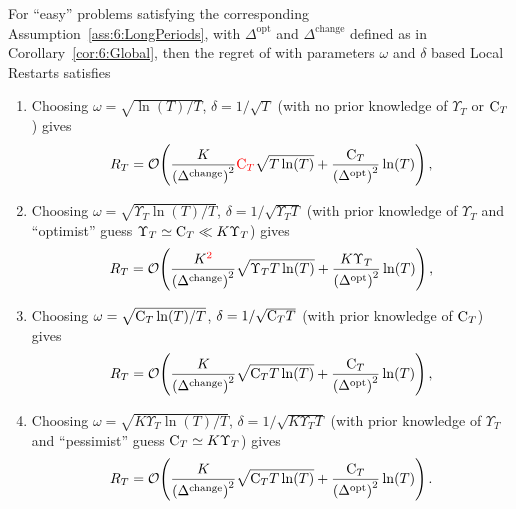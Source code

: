 \begin{corollary}\label{cor:6:Local}
    For ``easy'' problems satisfying the corresponding Assumption~\ref{ass:6:LongPeriods},
    with $\Delta^{\text{opt}}$ and ${\Delta}^{\text{change}}$ defined as in Corollary~\ref{cor:6:Global}, then the regret of \GLRklUCB{} with parameters $\omega$ and $\delta$ based Local Restarts satisfies

    \begin{enumerate}
        \item
        Choosing $\omega = \sqrt{\ln(T) / T}$, $\delta = 1 / \sqrt{T}$ (with no prior knowledge of $\Upsilon_T$ or $\mathrm{C}_T$) gives
        \begin{equation}
            R_T = \mathop{}\mathopen{}\mathcal{O}\mathopen{}\left(\frac{K}{\left(\Delta^{\text{change}}\right)^2} \textcolor{red}{\mathrm{C}_T}\sqrt{T\ln(T)} + \frac{\mathrm{C}_T}{\left(\Delta^{\text{opt}}\right)^2} \ln(T)\right),
        \end{equation}

        \item
        Choosing $\omega = \sqrt{\Upsilon_T\ln(T) / T}$, $\delta = 1 / \sqrt{\Upsilon_T T}$ (with prior knowledge of $\Upsilon_T$ and ``optimist'' guess $\Upsilon_T \simeq \mathrm{C}_T \ll K \Upsilon_T$) gives
        \begin{equation}
            R_T = \mathop{}\mathopen{}\mathcal{O}\mathopen{}\left(\frac{K^{\textcolor{red}{2}}}{\left({\Delta}^{\text{change}}\right)^2}\sqrt{\Upsilon_T T\ln(T)} + \frac{K\Upsilon_T}{\left(\Delta^{\text{opt}}\right)^2}\ln(T)\right),
        \end{equation}

        \item
        Choosing $\omega = \sqrt{\mathrm{C}_T\ln(T) / T}$, $\delta = 1 / \sqrt{\mathrm{C}_T T}$ (with prior knowledge of $\mathrm{C}_T$) gives
        \begin{equation}
            R_T = \mathop{}\mathopen{}\mathcal{O}\mathopen{}\left(\frac{K}{\left({\Delta}^{\text{change}}\right)^2}\sqrt{\mathrm{C}_T T\ln(T)} + \frac{\mathrm{C}_T}{\left(\Delta^{\text{opt}}\right)^2}\ln(T)\right),
        \end{equation}

        \item
        Choosing $\omega = \sqrt{K\Upsilon_T\ln(T) / T}$, $\delta = 1 / \sqrt{K\Upsilon_T T}$ (with prior knowledge of $\Upsilon_T$ and ``pessimist'' guess $\mathrm{C}_T \simeq K \Upsilon_T$) gives
        \begin{equation}
            R_T = \mathop{}\mathopen{}\mathcal{O}\mathopen{}\left(\frac{K}{\left({\Delta}^{\text{change}}\right)^2}\sqrt{\mathrm{C}_T T\ln(T)} + \frac{\mathrm{C}_T}{\left(\Delta^{\text{opt}}\right)^2} \ln(T)\right).
        \end{equation}
    \end{enumerate}
\end{corollary}


